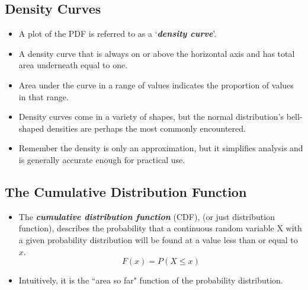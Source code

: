 \subsection*{Density Curves}


\begin{itemize}
	\item A plot of the PDF is referred to as a `\textbf{\emph{density curve}}'.
	\item A density curve that is always on or above the horizontal axis and has total area underneath equal to one.
	\item Area under the curve in a range of values indicates the proportion of values in that range.
	\item Density curves come in a variety of shapes, but the normal distribution's bell-shaped densities are perhaps the most commonly encountered.
	\item Remember the density is only an approximation, but it simplifies analysis and is generally accurate enough for practical use.
\end{itemize}


\subsection*{The Cumulative Distribution Function }
\begin{itemize}
	\item The \textbf{\emph{cumulative distribution function}} (CDF), (or just distribution function), describes the probability that a continuous random variable X with a given probability distribution will be found at a value less than or equal to $x$.\\
	
	\[ F(x) = P(X \leq x) \]
	
	\item Intuitively, it is the ``area so far" function of the probability distribution.
\end{itemize}


